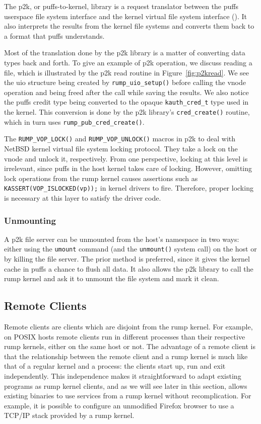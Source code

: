 The p2k, or puffs-to-kernel, library is a request translator between
the puffs userspace file system interface and the kernel virtual
file system interface ().  It also interprets
the results from the kernel file systems and converts them back to
a format that puffs understands.

Most of the translation done by the p2k library is a matter of
converting data types back and forth.  To give an example of p2k
operation, we discuss reading a file, which is illustrated by the
p2k read routine in Figure~\ref{fig:p2kread}.  We see the uio
structure being created by \verb+rump_uio_setup()+ before calling
the vnode operation and being freed after the call while saving the
results.  We also notice the puffs credit type being converted to
the opaque \verb+kauth_cred_t+ type used in the kernel.  This conversion
is done by the p2k library's \verb+cred_create()+ routine, which
in turn uses \verb+rump_pub_cred_create()+.

The \verb+RUMP_VOP_LOCK()+ and \verb+RUMP_VOP_UNLOCK()+ macros in
p2k to deal with NetBSD kernel virtual file system locking protocol.
They take a lock on the vnode and unlock it,
respectively.  From one perspective, locking at this level is
irrelevant, since puffs in the host kernel takes care of locking.
However, omitting lock operations from the rump kernel causes assertions
such as \verb+KASSERT(VOP_ISLOCKED(vp));+ in kernel drivers to fire.
Therefore, proper locking is necessary at this layer to satisfy the
driver code.

\subsubsection{Unmounting}

A p2k file server can be unmounted from the host's namespace in
two ways: either using the \texttt{umount} command (and the
\texttt{unmount()} system call) on the host or by killing the file
server.  The prior method is preferred, since it gives the kernel
cache in puffs a chance to flush all data.  It also allows the p2k
library to call the rump kernel and ask it to unmount the file
system and mark it clean.

\subsection{Remote Clients}
\label{sect:sysproxyimpl}

Remote clients are clients which are disjoint from the rump kernel.
For example, on POSIX hosts remote clients run in different processes
than their respective rump kernels, either on the same host or not.
The advantage of a remote client is that the relationship between
the remote client and a rump kernel is much like that of a regular
kernel and a process: the clients start up, run and exit independently.
This independence makes it straightforward to adapt existing programs
as rump kernel clients, and as we will see later in this section,
allows existing binaries to use services from a rump kernel without
recomplication.  For example, it is possible to configure an unmodified
Firefox browser to use a TCP/IP stack provided by a rump kernel.

